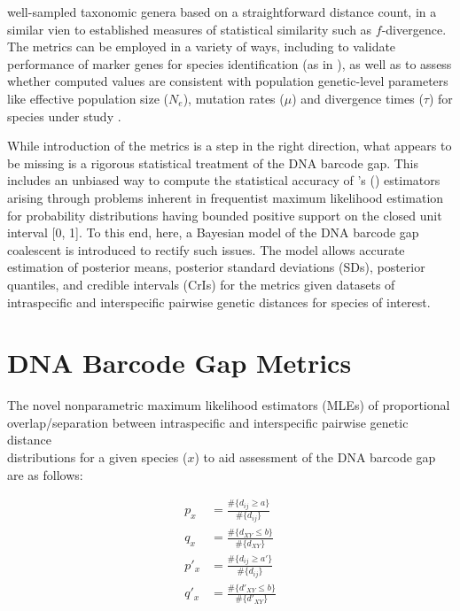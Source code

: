 \documentclass[12pt]{article}
\begin{document}
well-sampled taxonomic genera based on a straightforward distance count, in a similar vien to established measures of statistical similarity such as $f$-divergence. The metrics can be employed in a variety of ways, including to validate performance of marker genes for species identification (as in \citet{phillips2024measure}), as well as to assess whether computed values are consistent with population genetic-level parameters like effective population size ($N_e$), mutation rates ($\mu$) and divergence times ($\tau$) for species under study \citep{mather2019practical}. 

While introduction of the metrics is a step in the right direction, what appears to be missing is a rigorous statistical treatment of the DNA barcode gap. This includes an unbiased way to compute the statistical accuracy of \citeauthor{phillips2024measure}'s (\citeyear{phillips2024measure}) estimators arising through problems inherent in frequentist maximum likelihood estimation for probability distributions having bounded positive support on the closed unit interval [0, 1]. To this end, here, a Bayesian model of the DNA barcode gap coalescent is introduced to rectify such issues. The model allows accurate estimation of posterior means, posterior standard deviations (SDs), posterior quantiles, and credible intervals (CrIs) for the metrics given datasets of intraspecific and interspecific pairwise genetic distances for species of interest.


\section{DNA Barcode Gap Metrics}

The novel nonparametric maximum likelihood estimators (MLEs) of proportional \\ overlap/separation between intraspecific and interspecific pairwise genetic distance \\ distributions for a given species ($x$) to aid assessment of the DNA barcode gap are as follows:

\begin{align}
p_x &= \frac{\#\{d_{ij} \geq a\}}{\#\{d_{ij}\}} \\[1mm]
q_x &= \frac{\#\{d_{XY} \leq b\}}{\#\{d_{XY}\}} \\[1mm]
p'_x &= \frac{\#\{d_{ij} \geq a'\}}{\#\{d_{ij}\}} \\[1mm]
q'_x &= \frac{\#\{d'_{XY} \leq b\}}{\#\{d'_{XY}\}}
\end{align}
\end{document}
